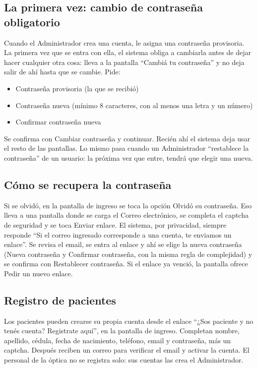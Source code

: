 \subsection{La primera vez: cambio de contraseña obligatorio}
\label{sec:mu-cambio-obligatorio}

Cuando el Administrador crea una cuenta, le asigna una contraseña provisoria. La primera vez que se entra con ella, el sistema obliga a cambiarla antes de dejar hacer cualquier otra cosa: lleva a la pantalla ``Cambiá tu contraseña'' y no deja salir de ahí hasta que se cambie. Pide:

\begin{itemize}
  \item Contraseña provisoria (la que se recibió)
  \item Contraseña nueva (mínimo 8 caracteres, con al menos una letra y un número)
  \item Confirmar contraseña nueva
\end{itemize}

Se confirma con Cambiar contraseña y continuar. Recién ahí el sistema deja usar el resto de las pantallas. Lo mismo pasa cuando un Administrador ``restablece la contraseña'' de un usuario: la próxima vez que entre, tendrá que elegir una nueva.

\subsection{Cómo se recupera la contraseña}
\label{sec:mu-recuperar-password}

Si se olvidó, en la pantalla de ingreso se toca la opción Olvidó su contraseña. Eso lleva a una pantalla donde se carga el Correo electrónico, se completa el captcha de seguridad y se toca Enviar enlace. El sistema, por privacidad, siempre responde ``Si el correo ingresado corresponde a una cuenta, te enviamos un enlace''. Se revisa el email, se entra al enlace y ahí se elige la nueva contraseña (Nueva contraseña y Confirmar contraseña, con la misma regla de complejidad) y se confirma con Restablecer contraseña. Si el enlace ya venció, la pantalla ofrece Pedir un nuevo enlace.

\subsection{Registro de pacientes}
\label{sec:mu-registro-pacientes}

Los pacientes pueden crearse su propia cuenta desde el enlace ``¿Sos paciente y no tenés cuenta? Registrate aquí'', en la pantalla de ingreso. Completan nombre, apellido, cédula, fecha de nacimiento, teléfono, email y contraseña, más un captcha. Después reciben un correo para verificar el email y activar la cuenta. El personal de la óptica no se registra solo: sus cuentas las crea el Administrador.

